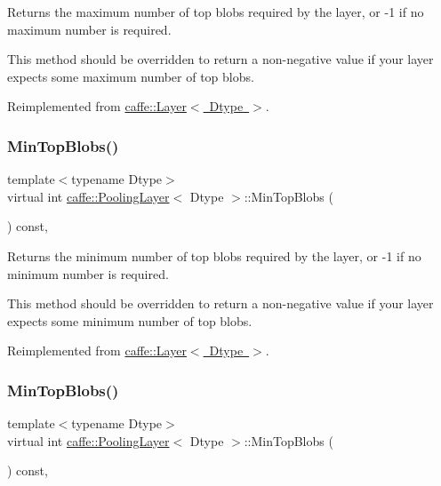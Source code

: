 Returns the maximum number of top blobs required by the layer, or -\/1 if no maximum number is required. 

This method should be overridden to return a non-\/negative value if your layer expects some maximum number of top blobs. 

Reimplemented from \mbox{\hyperlink{classcaffe_1_1_layer_ac6c03df0b6e40e776c94001e19994a2e}{caffe\+::\+Layer$<$ Dtype $>$}}.

\mbox{\label{classcaffe_1_1_pooling_layer_abb61ab67b2bd809c5633a2722b83feeb}} 
\subsubsection{\texorpdfstring{Min\+Top\+Blobs()}{MinTopBlobs()}\hspace{0.1cm}{\footnotesize\ttfamily [1/2]}}
{\footnotesize\ttfamily template$<$typename Dtype$>$ \\
virtual int \mbox{\hyperlink{classcaffe_1_1_pooling_layer}{caffe\+::\+Pooling\+Layer}}$<$ Dtype $>$\+::Min\+Top\+Blobs (\begin{DoxyParamCaption}{ }\end{DoxyParamCaption}) const\hspace{0.3cm}{\ttfamily [inline]}, {\ttfamily [virtual]}}



Returns the minimum number of top blobs required by the layer, or -\/1 if no minimum number is required. 

This method should be overridden to return a non-\/negative value if your layer expects some minimum number of top blobs. 

Reimplemented from \mbox{\hyperlink{classcaffe_1_1_layer_ab9e4c8d642e413948b131d851a8462a4}{caffe\+::\+Layer$<$ Dtype $>$}}.

\mbox{\label{classcaffe_1_1_pooling_layer_abb61ab67b2bd809c5633a2722b83feeb}} 
\subsubsection{\texorpdfstring{Min\+Top\+Blobs()}{MinTopBlobs()}\hspace{0.1cm}{\footnotesize\ttfamily [2/2]}}
{\footnotesize\ttfamily template$<$typename Dtype$>$ \\
virtual int \mbox{\hyperlink{classcaffe_1_1_pooling_layer}{caffe\+::\+Pooling\+Layer}}$<$ Dtype $>$\+::Min\+Top\+Blobs (\begin{DoxyParamCaption}{ }\end{DoxyParamCaption}) const\hspace{0.3cm}{\ttfamily [inline]}, {\ttfamily [virtual]}}



